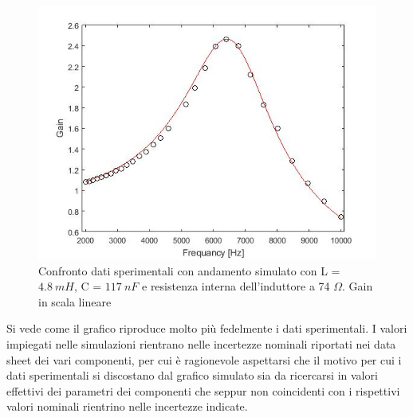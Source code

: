 \documentclass[journal, a4paper]{IEEEtran}
\begin{document}
\begin{figure}[htp]
\centering
\includegraphics[scale=.34]{graph4}
\caption{Confronto dati sperimentali con andamento simulato con L = $4.8~mH$, C = $117 ~nF$ e resistenza interna dell'induttore a 74 $\Omega$. Gain in scala lineare}
\end{figure}

Si vede come il grafico riproduce molto più fedelmente i dati sperimentali. I valori impiegati nelle simulazioni rientrano nelle incertezze nominali riportati nei data sheet dei vari componenti, per cui è ragionevole aspettarsi che il motivo per cui i dati sperimentali si discostano dal grafico simulato sia da ricercarsi in valori effettivi dei parametri dei componenti che seppur non coincidenti con i rispettivi valori nominali rientrino nelle incertezze indicate.




\end{document}

